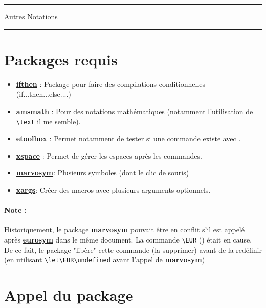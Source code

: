 \documentclass[a4paper,12pt]{article}
\begin{document}
	\begin{center}
		\hrule{\Large Autres Notations}\\\hrule
	\end{center}
	
	\section{Packages requis}

		\begin{itemize}
			\item \href{http://www.ctan.org/pkg/ifthen}{\textbf{ifthen}} : Package pour faire des compilations conditionnelles (if...then...else....)
			\item \href{http://www.ctan.org/pkg/amsmath}{\textbf{amsmath}} : Pour des notations mathématiques (notamment l'utilisation de \verb!\text! il me semble).
			\item \href{https://www.ctan.org/pkg/etoolbox}{\textbf{etoolbox}} : Permet notamment de tester si une commande existe avec \ifdef .
			\item \href{https://www.ctan.org/pkg/xspace}{\textbf{xspace}} : Permet de gérer les espaces après les commandes.
			\item \href{https://www.ctan.org/pkg/marvosym}{\textbf{marvosym}}: Plusieurs symboles (dont le clic de souris)
			\item \href{https://ctan.org/pkg/xargs}{\textbf{xargs}}: Créer des macros avec plusieurs arguments optionnels.
		\end{itemize}
		
		\paragraph{Note : } Historiquement, le package \href{https://www.ctan.org/pkg/marvosym}{\textbf{marvosym}} pouvait être en conflit s'il est appelé après
			\href{https://www.ctan.org/pkg/eurosym}{\textbf{eurosym}} dans le même document.
			La commande \verb!\EUR! (\EUR) était en cause.
			De ce fait, le package "libère" cette commande (la supprimer) avant de la redéfinir (en utilisant \verb!\let\EUR\undefined! avant l'appel de \href{https://www.ctan.org/pkg/marvosym}{\textbf{marvosym}})
		
	\section{Appel du package}
\end{document}
